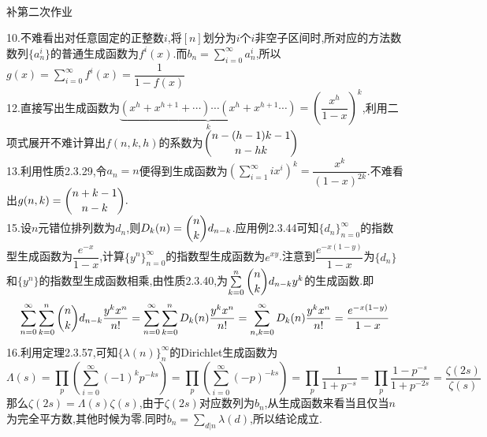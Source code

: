 \documentclass[b5paper]{ctexart}
\begin{document}
\pagestyle{plain}
\noindent
\\
\begin{center}
{补第二次作业}
\end{center}
10.不难看出对任意固定的正整数$i$,将$[n]$划分为$i$个$i$非空子区间时,所对应的方法数数列$\{a_n^i\}$的普通生成函数为$f^i(x)$.而$b_n=\sum\limits_{i=0}^\infty a_n^i$,所以$g(x)=\sum\limits_{i=0}^\infty f^i(x)=\dfrac{1}{1-f(x)}$\\
12.直接写出生成函数为$\underbrace{(x^h+x^{h+1}+\cdots)\cdots (x^h+x^{h+1}\cdots)}_k=\left( \dfrac{x^h}{1-x}\right) ^k$,利用二项式展开不难计算出$f(n,k,h)$的系数为$\dbinom{n-(h-1)k-1}{n-hk}$\\
13.利用性质2.3.29,令$a_n=n$便得到生成函数为$(\sum\limits_{i=1}^\infty ix^i)^k=\dfrac{x^k}{(1-x)^{2k}}$.不难看出$g(n,k)=\dbinom{n+k-1}{n-k}.$\\
15.设$n$元错位排列数为$d_n$,则$D_k(n)=\dbinom{n}{k}d_{n-k}$.应用例2.3.44可知$\{d_n\}_{n=0}^\infty$的指数型生成函数为$\dfrac{e^{-x}}{1-x}$,计算$\{y^n\}_{n=0}^\infty$的指数型生成函数为$e^{xy}$.注意到$\dfrac{e^{-x(1-y)}}{1-x}$为$\{d_n\}$和$\{y^n\}$的指数型生成函数相乘,由性质2.3.40,为$\sum\limits_{k=0}^n\dbinom{n}{k}d_{n-k}y^k$的生成函数.即
\[\sum_{n=0}^\infty\sum\limits_{k=0}^n\dbinom{n}{k}d_{n-k}\dfrac{y^kx^n}{n!}=\sum_{n=0}^\infty\sum\limits_{k=0}^nD_k(n)\dfrac{y^kx^n}{n!}=\sum_{n,k=0}^\infty D_k(n)\dfrac{y^kx^n}{n!}=\dfrac{e^{-x(1-y)}}{1-x}\]
16.利用定理2.3.57,可知$\{\lambda(n)\}_n^\infty$的Dirichlet生成函数为
\[\varLambda(s)=\prod_p\left( \sum\limits_{i=0}^\infty(-1)^kp^{-ks}\right) =\prod_p\left( \sum\limits_{i=0}^\infty(-p)^{-ks}\right)=\prod_p\dfrac{1}{1+p^{-s}}=\prod_p\dfrac{1-p^{-s}}{1+p^{-2s}}=\dfrac{\zeta(2s)}{\zeta(s)}\]
那么$\zeta(2s)=\varLambda(s)\zeta(s)$,由于$\zeta(2s)$对应数列为$b_n$,从生成函数来看当且仅当$n$为完全平方数,其他时候为零.同时$b_n=\sum\limits_{d|n}\lambda(d)$,所以结论成立.
\end{document}
